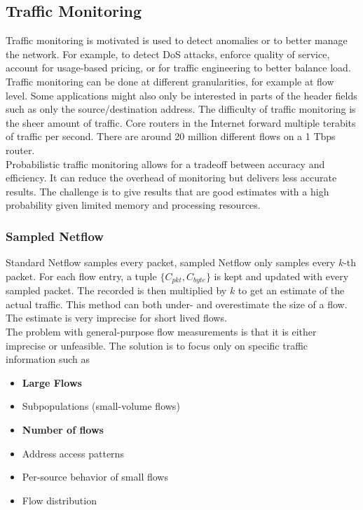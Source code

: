 \subsection{Traffic Monitoring}
Traffic monitoring is motivated is used to detect anomalies or to better manage the network. For example, to detect DoS attacks, enforce quality of service, account for usage-based pricing, or for traffic engineering to better balance load. Traffic monitoring can be done at different granularities, for example at flow level. Some applications might also only be interested in parts of the header fields such as only the source/destination address. The difficulty of traffic monitoring is the sheer amount of traffic. Core routers in the Internet forward multiple terabits of traffic per second. There are around 20 million different flows on a 1 Tbps router.\\
Probabilistic traffic monitoring allows for a tradeoff between accuracy and efficiency. It can reduce the overhead of monitoring but delivers less accurate results. The challenge is to give results that are good estimates with a high probability given limited memory and processing resources.

\subsubsection{Sampled Netflow}
Standard Netflow samples every packet, sampled Netflow only samples every $k$-th packet. For each flow entry, a tuple $\{C_{pkt}, C_{byte}\}$ is kept and updated with every sampled packet. The recorded is then multiplied by $k$ to get an estimate of the actual traffic. This method can both under- and overestimate the size of a flow. The estimate is very imprecise for short lived flows.\vspace{.3cm}\\

The problem with general-purpose flow measurements is that it is either imprecise or unfeasible. The solution is to focus only on specific traffic information such as
\begin{itemize}
\item \textbf{Large Flows}
\item Subpopulations (small-volume flows)
\item \textbf{Number of flows}
\item Address access patterns
\item Per-source behavior of small flows
\item Flow distribution
\end{itemize}

